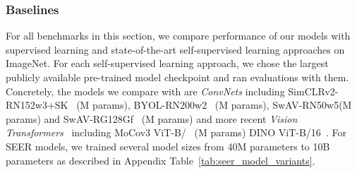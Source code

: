 \documentclass[10pt,twocolumn,letterpaper]{article}
\newcommand{\vit}{ViT\xspace}
\newcommand{\swavbigrn}{SwAV-RN50w5\xspace}
\newcommand{\swavbigregnet}{SwAV-RG128Gf\xspace}
\newcommand{\dino}{DINO\xspace}
\newcommand{\moco}{MoCov3\xspace}
\newcommand{\byolbig}{BYOL-RN200w2\xspace}
\newcommand{\simclrbig}{SimCLRv2-RN152w3+SK\xspace}
\begin{document}
\subsubsection{Baselines}
\label{sec:models_baseline}
For all benchmarks in this section, we compare performance of our models with supervised learning and state-of-the-art self-supervised learning approaches on ImageNet. For each self-supervised learning approach, we chose the largest publicly available pre-trained model checkpoint and ran evaluations with them. Concretely, the models we compare with are \textit{ConvNets} including \simclrbig~\cite{chen2020big} (M params), \byolbig~\cite{grill2020bootstrap} (M params), \swavbigrn (M params) and \swavbigregnet~\cite{caron2020unsupervised} (M params) and more recent \textit{Vision Transformers}~\cite{dosovitskiy2021image} including \moco \vit-B/~\cite{chen2021empirical} (M params) \dino \vit-B/16~\cite{caron2021emerging}. For SEER models, we trained several model sizes from 40M parameters to 10B parameters as described in Appendix Table~\ref{tab:seer_model_variants}.
\end{document}
